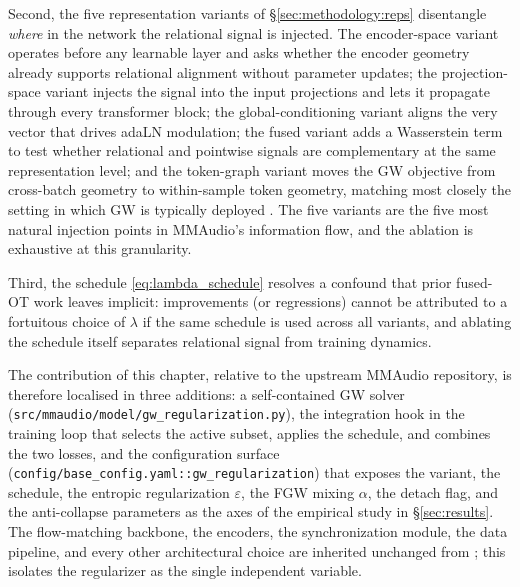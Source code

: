 Second, the five representation variants of
\S\ref{sec:methodology:reps} disentangle \emph{where} in the
network the relational signal is injected. The encoder-space
variant operates before any learnable layer and asks whether the
encoder geometry already supports relational alignment without
parameter updates; the projection-space variant injects the
signal into the input projections and lets it propagate through
every transformer block; the global-conditioning variant aligns
the very vector that drives adaLN modulation; the fused variant
adds a Wasserstein term to test whether relational and pointwise
signals are complementary at the same representation level; and
the token-graph variant moves the GW objective from cross-batch
geometry to within-sample token geometry, matching most closely
the setting in which GW is typically deployed
\citep{chen_2020_graph, vayer_2019_optimal}. The five variants
are the five most natural injection points in MMAudio's
information flow, and the ablation is exhaustive at this
granularity.

Third, the schedule \eqref{eq:lambda_schedule} resolves a confound
that prior fused-OT work leaves implicit: improvements (or
regressions) cannot be attributed to a fortuitous choice of
$\lambda$ if the same schedule is used across all variants, and
ablating the schedule itself separates relational signal from
training dynamics.

The contribution of this chapter, relative to the upstream
MMAudio repository, is therefore localised in three additions: a
self-contained GW solver
(\texttt{src/mmaudio/model/gw\_regularization.py}), the integration
hook in the training loop that selects the active subset, applies
the schedule, and combines the two losses, and the configuration
surface (\texttt{config/base\_config.yaml::gw\_regularization}) that
exposes the variant, the schedule, the entropic regularization
$\varepsilon$, the FGW mixing $\alpha$, the detach flag, and the
anti-collapse parameters as the axes of the empirical study in
\S\ref{sec:results}. The flow-matching backbone, the encoders, the
synchronization module, the data pipeline, and every other
architectural choice are inherited unchanged from
\citet{cheng_2025_mmaudio}; this isolates the regularizer as the
single independent variable.
